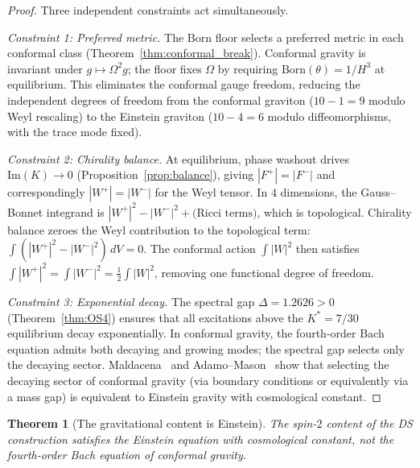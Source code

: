 \documentclass[11pt,a4paper]{article}
\newtheorem{theorem}{Theorem}[section]
\theoremstyle{definition}
\theoremstyle{remark}
\begin{document}
\begin{proof}
Three independent constraints act simultaneously.

\emph{Constraint 1: Preferred metric.} The Born floor selects a preferred metric in each conformal class (Theorem~\ref{thm:conformal_break}). Conformal gravity is invariant under $g\mapsto\Omega^2 g$; the floor fixes $\Omega$ by requiring $\mathrm{Born}(\theta)=1/H^3$ at equilibrium. This eliminates the conformal gauge freedom, reducing the independent degrees of freedom from the conformal graviton ($10-1=9$ modulo Weyl rescaling) to the Einstein graviton ($10-4=6$ modulo diffeomorphisms, with the trace mode fixed).

\emph{Constraint 2: Chirality balance.} At equilibrium, phase washout drives $\mathrm{Im}(K)\to 0$ (Proposition~\ref{prop:balance}), giving $|F^+|=|F^-|$ and correspondingly $|W^+|=|W^-|$ for the Weyl tensor. In $4$ dimensions, the Gauss--Bonnet integrand is $|W^+|^2-|W^-|^2+\text{(Ricci terms)}$, which is topological. Chirality balance zeroes the Weyl contribution to the topological term: $\int(|W^+|^2-|W^-|^2)\,dV=0$. The conformal action $\int|W|^2$ then satisfies $\int|W^+|^2=\int|W^-|^2=\frac{1}{2}\int|W|^2$, removing one functional degree of freedom.

\emph{Constraint 3: Exponential decay.} The spectral gap $\Delta=1.2626>0$ (Theorem~\ref{thm:OS4}) ensures that all excitations above the $K^*=7/30$ equilibrium decay exponentially. In conformal gravity, the fourth-order Bach equation admits both decaying and growing modes; the spectral gap selects only the decaying sector. Maldacena~\cite{Maldacena2011} and Adamo--Mason~\cite{AdamoMason2014} show that selecting the decaying sector of conformal gravity (via boundary conditions or equivalently via a mass gap) is equivalent to Einstein gravity with cosmological constant.
\end{proof}

\begin{theorem}[The gravitational content is Einstein]\label{thm:einstein}
The spin-$2$ content of the DS construction satisfies the Einstein equation with cosmological constant, not the fourth-order Bach equation of conformal gravity.
\end{theorem}
\end{document}
